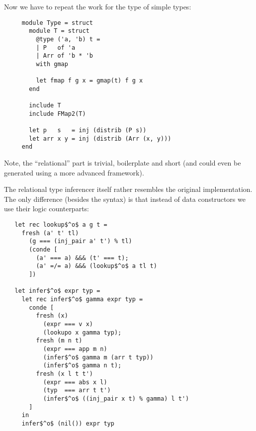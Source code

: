 Now we have to repeat the work for the type of simple types:

\begin{lstlisting}
     module Type = struct
       module T = struct
         @type ('a, 'b) t =
         | P   of 'a
         | Arr of 'b * 'b
         with gmap

         let fmap f g x = gmap(t) f g x
       end

       include T
       include FMap2(T)

       let p   s   = inj (distrib (P s))
       let arr x y = inj (distrib (Arr (x, y)))
     end
\end{lstlisting}

Note, the ``relational'' part is trivial, boilerplate and short (and could even be generated
using a more advanced framework).

The relational type inferencer itself rather resembles the original implementation. The only
difference (besides the syntax) is that instead of data constructors we use their logic
counterparts:

\begin{lstlisting}
   let rec lookup$^o$ a g t =
     fresh (a' t' tl)
       (g === (inj_pair a' t') % tl)
       (conde [
         (a' === a) &&& (t' === t);
         (a' =/= a) &&& (lookup$^o$ a tl t)
       ])

   let infer$^o$ expr typ =
     let rec infer$^o$ gamma expr typ =
       conde [
         fresh (x)
           (expr === v x)
           (lookupo x gamma typ);
         fresh (m n t)
           (expr === app m n)
           (infer$^o$ gamma m (arr t typ))
           (infer$^o$ gamma n t);
         fresh (x l t t')
           (expr === abs x l)
           (typ  === arr t t')
           (infer$^o$ ((inj_pair x t) % gamma) l t')
       ]
     in
     infer$^o$ (nil()) expr typ
\end{lstlisting}
